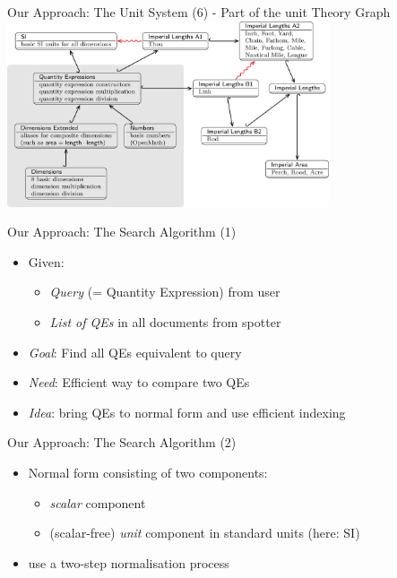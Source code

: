 \documentclass{beamer}
\begin{document}
  \begin{frame}{Our Approach: The Unit System (6) - Part of the unit Theory Graph}
    \includegraphics[width=95mm]{imgs/graph1.png}
  \end{frame}

  \begin{frame}{Our Approach: The Search Algorithm (1)}
    \begin{itemize}[<+->]
      \item Given:
      \begin{itemize}
        \item \textit{Query} (= Quantity Expression) from user
        \item \textit{List of QEs} in all documents from spotter
      \end{itemize}

      \item \textit{Goal}: Find all QEs equivalent to query

      \item \textit{Need}: Efficient way to compare two QEs
      \item \textit{Idea}: bring QEs to normal form and use efficient indexing
    \end{itemize}
  \end{frame}

  \begin{frame}{Our Approach: The Search Algorithm (2)}
    \begin{itemize}[<+->]
      \item Normal form consisting of two components:
      \begin{itemize}
        \item \textit{scalar} component
        \item (scalar-free) \textit{unit} component in standard units (here: SI)
      \end{itemize}
      \item use a two-step normalisation process
    \end{itemize}
  \end{frame}
\end{document}
